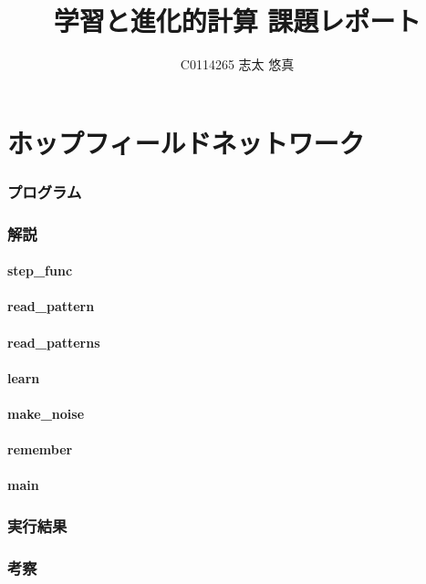 \documentclass{jsarticle}
\title{学習と進化的計算 課題レポート}
\author{C0114265 志太 悠真}
\begin{document}
\maketitle

\tableofcontents

\part{ホップフィールドネットワーク}
\section{プログラム}


\section{解説}
\subsection{step\_func}
\subsection{read\_pattern}
\subsection{read\_patterns}
\subsection{learn}
\subsection{make\_noise}
\subsection{remember}
\subsection{main}
\section{実行結果}
\section{考察}
\end{document}
